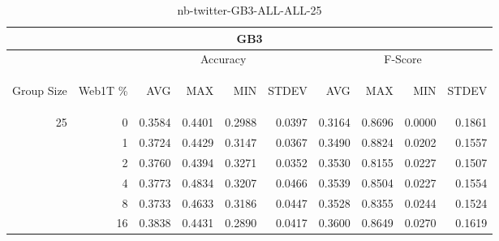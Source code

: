 \begin{center}
\begin{table}[htbp]
\begin{tabular}{ | r | r | r | r | r | r | r | r | r | r |}
\hline
\multicolumn{10}{|c|}{GB3}\\
\hline
 & & \multicolumn{4}{|c|}{Accuracy} & \multicolumn{4}{|c|}{F-Score}\\ \cline{3-10}
\begin{sideways}Group Size\end{sideways} & \begin{sideways}Web1T \%\end{sideways} & \begin{sideways}AVG\end{sideways} & \begin{sideways}MAX\end{sideways} & \begin{sideways}MIN\end{sideways} & \begin{sideways}STDEV\end{sideways} & \begin{sideways}AVG\end{sideways} & \begin{sideways}MAX\end{sideways} & \begin{sideways}MIN\end{sideways} & \begin{sideways}STDEV\end{sideways}\\
\hline
\multirow{5}{*}{25}
 & 0 & 0.3584 & 0.4401 & 0.2988 & 0.0397 & 0.3164 & 0.8696 & 0.0000 & 0.1861\\ \cline{2-10}
 & 1 & 0.3724 & 0.4429 & 0.3147 & 0.0367 & 0.3490 & 0.8824 & 0.0202 & 0.1557\\ \cline{2-10}
 & 2 & 0.3760 & 0.4394 & 0.3271 & 0.0352 & 0.3530 & 0.8155 & 0.0227 & 0.1507\\ \cline{2-10}
 & 4 & 0.3773 & 0.4834 & 0.3207 & 0.0466 & 0.3539 & 0.8504 & 0.0227 & 0.1554\\ \cline{2-10}
 & 8 & 0.3733 & 0.4633 & 0.3186 & 0.0447 & 0.3528 & 0.8355 & 0.0244 & 0.1524\\ \cline{2-10}
 & 16 & 0.3838 & 0.4431 & 0.2890 & 0.0417 & 0.3600 & 0.8649 & 0.0270 & 0.1619\\ \cline{2-10}
\hline
\end{tabular}
\caption{nb-twitter-GB3-ALL-ALL-25}
\label{table:nb-twitter-GB3-ALL-ALL-25}
\end{table}
\end{center}

